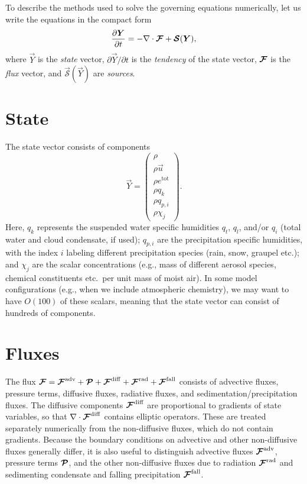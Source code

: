\documentclass{report}
\begin{document}
To describe the methods used to solve the governing equations numerically, let us write the equations in the compact form 
\begin{equation}\label{e:eom_compact}
\frac{\partial \boldsymbol{{Y}}}{\partial t}  =  - \nabla \cdot \boldsymbol{{\mathcal{F}}} + \boldsymbol{{\mathcal{S}}}(\boldsymbol{{Y}}),
\end{equation}
where $\vec{Y}$ is the \emph{state} vector, $\partial\vec{Y}/\partial t$ is the \emph{tendency} of the state vector, $\boldsymbol{{\mathcal{F}}}$ is the \emph{flux} vector, and $\vec{\mathcal{S}}(\vec{Y})$ are \emph{sources}. 

\section{State}

The state vector consists of components
\begin{equation}\label{e:state}
\vec{Y}=\left( \begin{array}{c}
\rho \\
\rho\vec{u} \\
\rho e^{\mathrm{tot}}\\
\rho q_k\\
\rho q_{p,i}\\
\rho \chi_j
\end{array}
\right).
\end{equation}
Here, $q_k$ represents the suspended water specific humidities $q_t$, $q_l$, and/or $q_i$ (total water and cloud condensate, if used); $q_{p,i}$ are the precipitation specific humidities, with the index $i$ labeling different precipitation species (rain, snow, graupel etc.); and $\chi_j$ are the scalar concentrations (e.g., mass of different aerosol species, chemical constituents etc.\ per unit mass of moist air). In some model configurations (e.g., when we include atmospheric chemistry), we may want to have $O(100)$ of these scalars, meaning that the state vector can consist of hundreds of components.

\section{Fluxes}\label{sec:fluxes}

The flux $\boldsymbol{{\mathcal{F}}}=\boldsymbol{{\mathcal{F}}}^{\mathrm{adv}} + \boldsymbol{{\mathcal{P}}} +  \boldsymbol{{\mathcal{F}}}^{\mathrm{diff}} + \boldsymbol{{\mathcal{F}}}^{\mathrm{rad}} + \boldsymbol{{\mathcal{F}}}^{\mathrm{fall}}$ consists of advective fluxes, pressure terms, diffusive fluxes, radiative fluxes, and sedimentation/precipitation fluxes. The diffusive components $\boldsymbol{{\mathcal{F}}}^{\mathrm{diff}}$ are proportional to gradients of state variables, so that $\nabla \cdot \boldsymbol{{\mathcal{F}}}^{\mathrm{diff}}$ contains elliptic operators. These are treated separately numerically from the non-diffusive fluxes, which do not contain gradients. Because the boundary conditions on advective and other non-diffusive fluxes generally differ, it is also useful to distinguish advective fluxes $\boldsymbol{{\mathcal{F}}}^{\mathrm{adv}}$, pressure terms $\boldsymbol{{\mathcal{P}}}$, and the other non-diffusive fluxes due to radiation $\boldsymbol{{\mathcal{F}}}^{\mathrm{rad}}$ and sedimenting condensate and falling precipitation $\boldsymbol{{\mathcal{F}}}^{\mathrm{fall}}$. 
\end{document}
